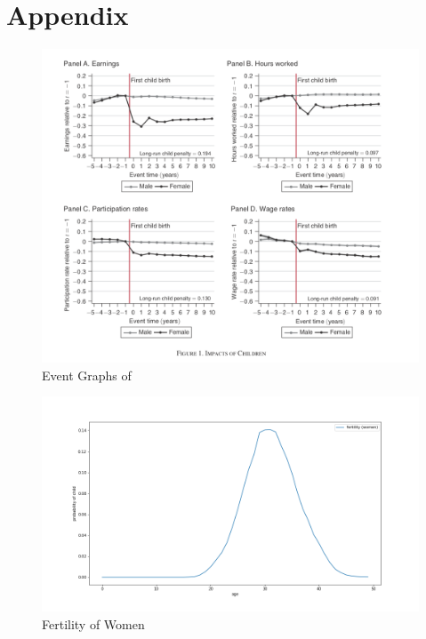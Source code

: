 \section*{Appendix}

\listoffigures
\listoftables

\newpage

\begin{figure}
    \centering
    \includegraphics[scale=0.3]{figures/kleven_10_years_impact.png}
    \caption{Event Graphs of \textcite{kleven_children_2019}}
    \label{fig:event_graphs_kleven}
\end{figure}

\begin{figure}
    \centering
    \includegraphics[scale=0.4]{figures/fertility_women_empirical.png}
    \caption{Fertility of Women}
    \label{fig:fertility_by_women}
\end{figure}

